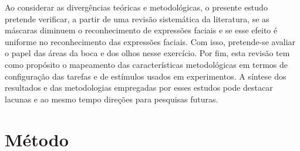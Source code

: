 \documentclass[portuguese]{textolivre}
\begin{document}
Ao considerar as divergências teóricas e metodológicas, o presente estudo pretende verificar, a partir de uma revisão sistemática da literatura, se as máscaras diminuem o reconhecimento de expressões faciais e se esse efeito é uniforme no reconhecimento das expressões faciais. Com isso, pretende-se avaliar o papel das áreas da boca e dos olhos nesse exercício. Por fim, esta revisão tem como propósito o mapeamento das características metodológicas em termos de configuração das tarefas e de estímulos usados em experimentos. A síntese dos resultados e das metodologias empregadas por esses estudos pode destacar lacunas e ao mesmo tempo direções para pesquisas futuras.



\section{Método}\label{sec-modelo}
\end{document}
